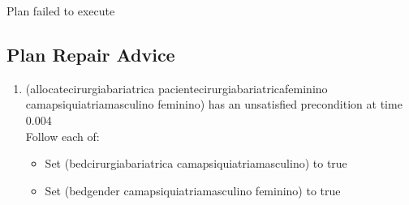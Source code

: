 \documentclass[a4paper,12pt]{article}
\newcommand{\action}[1]{{\sf #1}}
\newcommand{\exprn}[1]{{\sf #1}}
\begin{document}
Plan failed to execute
\subsection{Plan Repair Advice}
\begin{enumerate}
\item \action{(allocatecirurgiabariatrica pacientecirurgiabariatricafeminino camapsiquiatriamasculino feminino)} has an unsatisfied precondition at time 0.004\\
Follow each of:
\begin{itemize}\item Set \exprn{(bedcirurgiabariatrica camapsiquiatriamasculino)} to true
\item Set \exprn{(bedgender camapsiquiatriamasculino feminino)} to true
\end{itemize}\end{enumerate}
\end{document}
